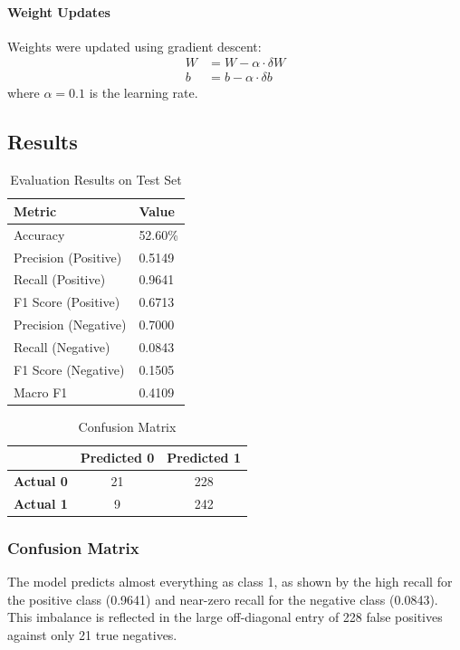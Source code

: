 \documentclass[sigconf]{acmart}
\begin{document}
\paragraph{Weight Updates}
Weights were updated using gradient descent:
\begin{align}
W &= W - \alpha \cdot \delta W \\
b &= b - \alpha \cdot \delta b
\end{align}
where $\alpha = 0.1$ is the learning rate.

\subsection{Results}

\begin{table}[H]
\caption{Evaluation Results on Test Set}
\label{tab:results}
\begin{tabular}{@{}ll@{}}
\toprule
\textbf{Metric} & \textbf{Value} \\ \midrule
Accuracy & 52.60\% \\
Precision (Positive) & 0.5149 \\
Recall (Positive) & 0.9641 \\
F1 Score (Positive) & 0.6713 \\
Precision (Negative) & 0.7000 \\
Recall (Negative) & 0.0843 \\
F1 Score (Negative) & 0.1505 \\
Macro F1 & 0.4109 \\ \bottomrule
\end{tabular}
\end{table}

\begin{table}[H]
\caption{Confusion Matrix}
\label{tab:confusion}
\begin{tabular}{@{}lcc@{}}
\toprule
 & \textbf{Predicted 0} & \textbf{Predicted 1} \\ \midrule
\textbf{Actual 0} & 21 & 228 \\
\textbf{Actual 1} & 9 & 242 \\ \bottomrule
\end{tabular}
\end{table}

\subsubsection{Confusion Matrix}
The model predicts almost everything as class 1, as shown by the high recall for the positive class (0.9641) and near-zero recall for the negative class (0.0843). This imbalance is reflected in the large off-diagonal entry of 228 false positives against only 21 true negatives.
\end{document}
